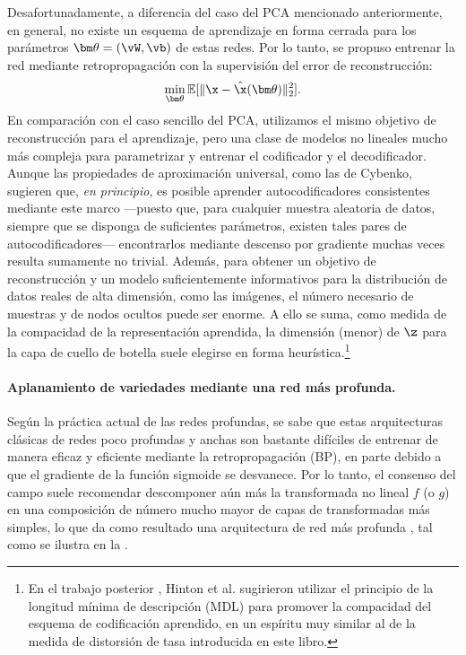 \documentclass[../../book-main_es.tex]{subfiles}
\begin{document}
Desafortunadamente, a diferencia del caso del PCA mencionado anteriormente, en general, no existe
un esquema de aprendizaje en forma cerrada para los parámetros $\bm \theta =
(\vW, \vb)$ de estas redes. Por lo tanto, se propuso entrenar la
red mediante retropropagación con la supervisión del error de reconstrucción:
\begin{equation}\label{eq:nonlinear-pca-ch5}
    \min_{\bm \theta} \mathbb{E}[ \|\x -
    \hat{\x}(\bm \theta)\|_2^2].
\end{equation}
En comparación con el caso sencillo del PCA, utilizamos el mismo objetivo de reconstrucción
para el aprendizaje, pero una clase de modelos no lineales mucho más compleja para
parametrizar y entrenar el codificador y el decodificador. Aunque las propiedades de aproximación universal,
como las de Cybenko, sugieren que, \textit{en principio},
es posible aprender autocodificadores consistentes mediante este marco ---puesto que, para
cualquier muestra aleatoria de datos, siempre que se disponga de suficientes parámetros, existen tales pares de 
autocodificadores--- encontrarlos mediante descenso por gradiente muchas veces resulta sumamente no trivial.
Además, para obtener un objetivo de reconstrucción y un modelo suficientemente informativos
para la
distribución de datos reales de alta dimensión, como las imágenes, el número necesario
de muestras y de nodos ocultos puede ser enorme.
A ello se suma, como medida de la compacidad de la representación aprendida, la
dimensión (menor) de $\z$ para la capa de cuello de botella suele elegirse
en forma heurística.\footnote{En el trabajo posterior \cite{Hinton-1993}, Hinton
    et al. sugirieron utilizar el principio de la longitud mínima de descripción (MDL)
    para promover
    la compacidad del esquema de codificación aprendido, en un espíritu muy
    similar al de la
medida de distorsión de tasa introducida en este libro.}

\paragraph{Aplanamiento de variedades mediante una red más profunda.}
Según la práctica actual de las redes profundas, se sabe que estas arquitecturas clásicas de redes poco profundas
y anchas son bastante difíciles de
entrenar de manera eficaz y eficiente mediante la retropropagación (BP), en parte
debido a que el gradiente de la función sigmoide se desvanece. Por lo tanto, el
consenso del campo suele recomendar descomponer aún más
la transformada no lineal $f$ (o $g$) en una composición de
número mucho mayor de capas de transformadas más simples, lo que da como resultado una arquitectura de red
más profunda
\cite{Hinton504}, tal como se ilustra en la .
\end{document}
